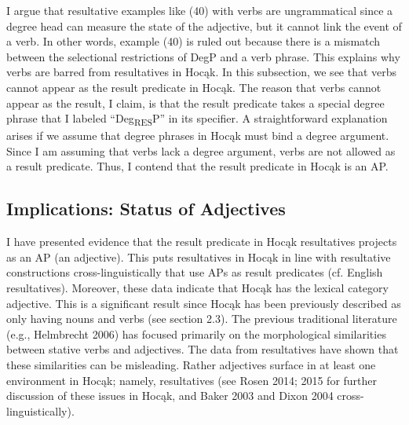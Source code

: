 \documentclass[output=paper]{LSP/langsci}
\begin{document}
\begin{exe}


\end{exe}

I argue that resultative examples like (40) with verbs are ungrammatical since a degree head can measure the state of the adjective, but it cannot link the event of a verb. In other words, example (40) is ruled out because there is a mismatch between the selectional restrictions of DegP and a verb phrase. This explains why verbs are barred from resultatives in Hocąk. In this subsection, we see that verbs cannot appear as the result predicate in Hocąk. The reason that verbs cannot appear as the result, I claim, is that the result predicate takes a special degree phrase that I labeled ``Deg\textsubscript{RES}P'' in its specifier. A straightforward explanation arises if we assume that degree phrases in Hocąk must bind a degree argument. Since I am assuming that verbs lack a degree argument, verbs are not allowed as a result predicate. Thus, I contend that the result predicate in Hocąk is an AP.

\subsection{Implications: Status of Adjectives}

I have presented evidence that the result predicate in Hocąk resultatives projects as an AP (an adjective). This puts resultatives in Hocąk in line with resultative constructions cross-linguistically that use APs as result predicates (cf. English resultatives). Moreover, these data indicate that Hocąk has the lexical category adjective. This is a significant result since Hocąk has been previously described as only having nouns and verbs (see section 2.3). The previous traditional literature (e.g., Helmbrecht 2006) has focused primarily on the morphological similarities between stative verbs and adjectives. The data from resultatives have shown that these similarities can be misleading. Rather adjectives surface in at least one environment in Hocąk; namely, resultatives (see Rosen 2014; 2015 for further discussion of these issues in Hocąk, and Baker 2003 and Dixon 2004 cross-linguistically).
\end{document}

